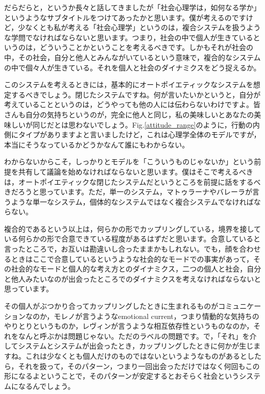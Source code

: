 \documentclass{ltjsbook}
\begin{document}
だらだらと，というか長々と話してきましたが「社会心理学は，如何なる学か」というようなサブタイトルをつけてあったかと思います。僕が考えるのですけど，少なくとも私が考える「社会心理学」というのは，複合システムを扱うような学問でなければならないと思います。つまり，社会の中で個人が生きているというのは，どういうことかということを考えるべきです。しかもそれが社会の中，その社会，自分と他人とみんながいているという意味で，複合的なシステムの中で個々人が生きている。それを個人と社会のダイナミクスをどう捉えるか。

このシステムを考えるときには，基本的にオートポイエティックなシステムを想定するべきでしょう。閉じたシステムですね。何が言いたいかというと，自分が考えていることというのは，どうやっても他の人には伝わらないわけですよ。皆さんも自分の気持ちというのが，完全に他人と同じ，私の美味しいとあなたの美味しいが同じだとは思わないでしょう。Fig.\ref{attitude_range}のように，行動の内側にタイプがありますよと言いましたけど，これは心理学全体のモデルですが，本当にそうなっているかどうかなんて誰にもわからない。

わからないからこそ，しっかりとモデルを「こういうものじゃないか」という前提を共有して議論を始めなければならないと思います。僕はそこで考えるべきは，オートポイエティックな閉じたシステムだというところを前提に話をするべきだろうと思っています。ただ，単一のシステム，マトゥラーナやバレーラが言うような単一なシステム，個体的なシステムではなく複合システムでなければならない。

複合的であるという以上は，何らかの形でカップリングしている，境界を接している何らかの形で合意できている程度があるはずだと思います。合意していると言ったところで，お互いは勘違いし合ったままかもしれない。でも，顔を合わせるときはここで合意しているというような社会的なモードでの事実があって，その社会的なモードと個人的な考え方とのダイナミクス，二つの個人と社会，自分と他人みたいなのが出会ったところでのダイナミクスを考えなければならないと思っています。

その個人がぶつかり合ってカップリングしたときに生まれるものがコミュニケーションなのか，モレノが言うようなemotional current，つまり情動的な気持ちのやりとりというものか，レヴィンが言うような相互依存性というものなのか，それをなんと呼ぶかは問題じゃない。ただのラベルの問題です。で，「それ」を介してシステムとシステムが出会ったとき，カップリングしたときに何かが生じますね。これは少なくとも個人だけのものではないというようなものがあるとしたら，それを扱って，そのパターン，つまり一回出会っただけではなく何回もこの形になるよということで，そのパターンが安定するとおそらく社会というシステムになるんでしょう。
\end{document}
